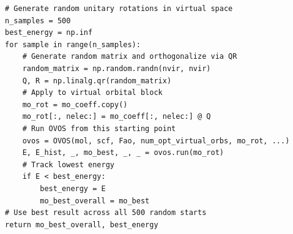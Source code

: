 \begin{lstlisting}[style=python, caption={Random unitary initialization}, label=lst:random_unitary]
# Generate random unitary rotations in virtual space
n_samples = 500
best_energy = np.inf
for sample in range(n_samples):
    # Generate random matrix and orthogonalize via QR
    random_matrix = np.random.randn(nvir, nvir)
    Q, R = np.linalg.qr(random_matrix)
    # Apply to virtual orbital block
    mo_rot = mo_coeff.copy()
    mo_rot[:, nelec:] = mo_coeff[:, nelec:] @ Q
    # Run OVOS from this starting point
    ovos = OVOS(mol, scf, Fao, num_opt_virtual_orbs, mo_rot, ...)
    E, E_hist, _, mo_best, _, _ = ovos.run(mo_rot)
    # Track lowest energy
    if E < best_energy:
        best_energy = E
        mo_best_overall = mo_best
# Use best result across all 500 random starts
return mo_best_overall, best_energy
\end{lstlisting}

